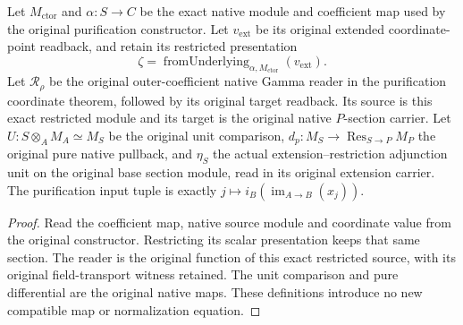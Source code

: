 \begin{definition}
\label{def:kn-mixed-native-coordinate-paths}
\leanok
Let $M_{\mathrm{ctor}}$ and $\alpha:S\to C$ be the exact native
module and coefficient map used by the original purification constructor.
Let $v_{\mathrm{ext}}$ be its original extended coordinate-point
readback, and retain its restricted presentation
\[
 \zeta=\operatorname{fromUnderlying}_{\alpha,M_{\mathrm{ctor}}}
                   (v_{\mathrm{ext}}).
\]
Let $\mathcal R_\rho$ be the original outer-coefficient native Gamma
reader in the purification coordinate theorem, followed by its original
target readback. Its source is this exact restricted module and its
target is the original native $P$-section carrier.
Let $U:S\otimes_A M_A\simeq M_S$ be the original unit comparison,
$d_p:M_S\to\operatorname{Res}_{S\to P}M_P$ the original pure native
pullback, and $\eta_S$ the actual extension--restriction adjunction unit
on the original base section module, read in its original extension
carrier. The purification input tuple is exactly
$j\mapsto i_B(\operatorname{im}_{A\to B}(x_j))$.
\end{definition}
\begin{proof}
Read the coefficient map, native source module and coordinate value
from the original constructor. Restricting its scalar presentation keeps
that same section. The reader is the original function of this exact
restricted source, with its original field-transport witness retained.
The unit comparison and pure differential are the original native maps.
These definitions introduce no new compatible map or normalization
equation.
\end{proof}

